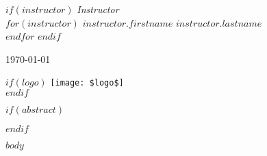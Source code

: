 \documentclass[12pt]{article}
\begin{document}
\begin{titlepage}
\begin{minipage}{0.4\textwidth}
\begin{flushright}
            $if(instructor)$
                \large
                \textit{Instructor}\\
                $for(instructor)$
                    $instructor.firstname$ \textsc{$instructor.lastname$}\\
                $endfor$
            $endif$
		\end{flushright}
	\end{minipage}
	


	\vfill\vfill %
	
	{\large\today} %
	
	
    $if(logo)$
	\vfill\vfill
	\texttt{[image: \$logo\$]}\\[1cm] %
    $endif$
	 
	
	\vfill %
	
\end{titlepage}

$if(abstract)$
\begin{abstract} 
{\bf $abstract-bold$} $abstract$ \end{abstract} 
$endif$

$body$



\end{document}
